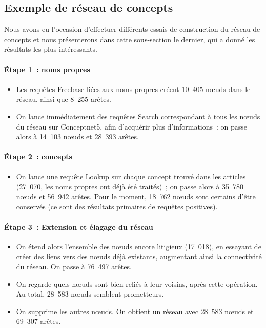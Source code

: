 \documentclass[a4paper, 12pt]{article}
\begin{document}
\subsection{Exemple de réseau de concepts}

Nous avons eu l'occasion d'effectuer différents essais de construction du réseau de concepts et nous présenterons dans cette sous-section le dernier, qui a donné les résultats les plus intéressants.

\paragraph{Étape 1~: noms propres}

\begin{itemize}
 \item Les requêtes Freebase liées aux noms propres créent 10~405 n\oe{}uds dans le réseau, ainsi que 8~255 arêtes.
 \item On lance immédiatement des requêtes Search correspondant à tous les n\oe{}uds du réseau sur Conceptnet5, afin d'acquérir plus d'informations~: on passe alors à 14~103 n\oe{}uds et 28~393 arêtes.
\end{itemize}

\paragraph{Étape 2~: concepts}

\begin{itemize}
 \item On lance une requête Lookup sur chaque concept trouvé dans les articles (27~070, les noms propres ont déjà été traités)~; on passe alors à 35~780 n\oe{}uds et 56~942 arêtes. Pour le moment, 18~762 n\oe{}uds sont certains d'être conservés (ce sont des résultats primaires de requêtes positives).
\end{itemize}


\paragraph{Étape 3~: Extension et élagage du réseau}

\begin{itemize}
 \item On étend alors l'ensemble des n\oe{}uds encore litigieux (17~018), en essayant de créer des liens vers des n\oe{}uds déjà existants, augmentant ainsi la connectivité du réseau. On passe à 76~497 arêtes.
 \item On regarde quels n\oe{}uds sont bien reliés à leur voisins, après cette opération. Au total, 28~583 n\oe{}uds semblent prometteurs.
 \item On supprime les autres n\oe{}uds. On obtient un réseau avec 28~583 n\oe{}uds et 69~307 arêtes.
\end{itemize}
\end{document}
